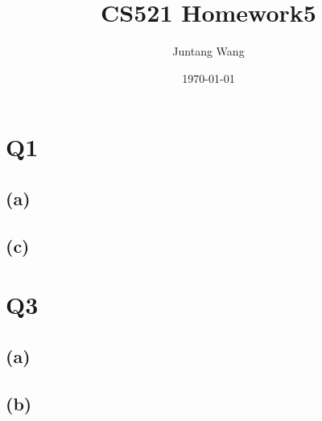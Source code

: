 \documentclass[12pt]{article} %
\title{CS521 Homework5} %
\author{Juntang Wang}        %
\date{\today}             %
\begin{document}
\section{Q1}
\subsection{(a)}

\subsection{(c)}


\section{Q3}
\subsection{(a)}

\subsection{(b)}


\printbibliography
\end{document}

